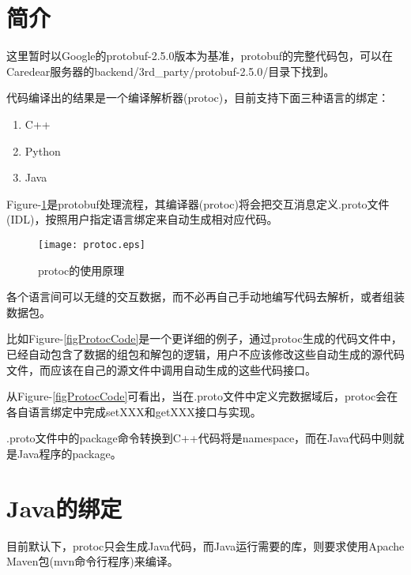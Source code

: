 \documentclass[a4paper]{article}
\title{\kai{服务器RPC机制protobuf}}
\author{CareDear Service Team}
\newcommand{\kai}[1]{{\KAI#1}}
\begin{document}
\maketitle

\tableofcontents

\begin{abstract}
\kai{本文档介绍Google的服务器间RPC机制－protobuf}
\end{abstract}


\section{简介}
这里暂时以Google的protobuf-2.5.0版本为基准，protobuf的完整代码包，可以在Caredear服务器的backend/3rd\_party/protobuf-2.5.0/目录下找到。

代码编译出的结果是一个编译解析器(protoc)，目前支持下面三种语言的绑定：

\begin{enumerate}
 \item C++
 \item Python
 \item Java
\end{enumerate}

Figure-\ref{figProtoc}是protobuf处理流程，其编译器(protoc)将会把交互消息定义.proto文件(IDL)，按照用户指定语言绑定来自动生成相对应代码。
\begin{figure}
\caption{protoc的使用原理}\label{figProtoc}
\centering
\texttt{[image: protoc.eps]}
\end{figure}

各个语言间可以无缝的交互数据，而不必再自己手动地编写代码去解析，或者组装数据包。

比如Figure-\ref{figProtocCode}是一个更详细的例子，通过protoc生成的代码文件中，已经自动包含了数据的组包和解包的逻辑，用户不应该修改这些自动生成的源代码文件，而应该在自己的源文件中调用自动生成的这些代码接口。

从Figure-\ref{figProtocCode}可看出，当在.proto文件中定义完数据域后，protoc会在各自语言绑定中完成setXXX和getXXX接口与实现。

.proto文件中的package命令转换到C++代码将是namespace，而在Java代码中则就是Java程序的package。

\section{Java的绑定}
目前默认下，protoc只会生成Java代码，而Java运行需要的库，则要求使用Apache Maven包(mvn命令行程序)来编译。
\end{document}
